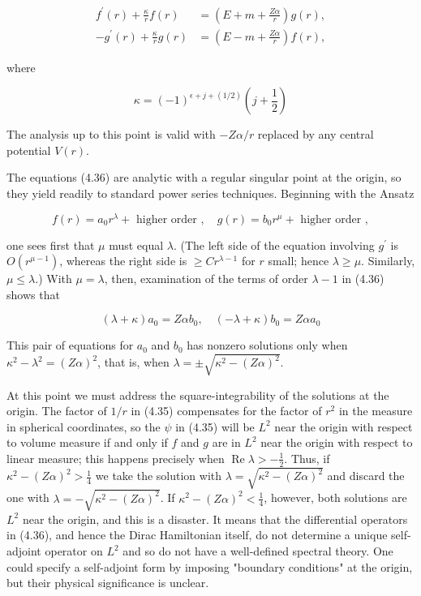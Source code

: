 \documentclass[10pt, letterpaper]{article}
\begin{document}
$$
\begin{aligned}
f^{\prime}(r)+\frac{\kappa}{r} f(r) & =\left(E+m+\frac{Z \alpha}{r}\right) g(r), \\
-g^{\prime}(r)+\frac{\kappa}{r} g(r) & =\left(E-m+\frac{Z \alpha}{r}\right) f(r),
\end{aligned}
$$

where

$$
\kappa=(-1)^{\epsilon+j+(1 / 2)}\left(j+\frac{1}{2}\right)
$$

The analysis up to this point is valid with $-Z \alpha / r$ replaced by any central potential $V(r)$.

The equations (4.36) are analytic with a regular singular point at the origin, so they yield readily to standard power series techniques. Beginning with the Ansatz

$$
f(r)=a_{0} r^{\lambda}+\text { higher order }, \quad g(r)=b_{0} r^{\mu}+\text { higher order },
$$

one sees first that $\mu$ must equal $\lambda$. (The left side of the equation involving $g^{\prime}$ is $O\left(r^{\mu-1}\right)$, whereas the right side is $\geq C r^{\lambda-1}$ for $r$ small; hence $\lambda \geq \mu$. Similarly, $\mu \leq \lambda$.) With $\mu=\lambda$, then, examination of the terms of order $\lambda-1$ in (4.36) shows that

$$
(\lambda+\kappa) a_{0}=Z \alpha b_{0}, \quad(-\lambda+\kappa) b_{0}=Z \alpha a_{0}
$$

This pair of equations for $a_{0}$ and $b_{0}$ has nonzero solutions only when $\kappa^{2}-\lambda^{2}= (Z \alpha)^{2}$, that is, when $\lambda= \pm \sqrt{\kappa^{2}-(Z \alpha)^{2}}$.

At this point we must address the square-integrability of the solutions at the origin. The factor of $1 / r$ in (4.35) compensates for the factor of $r^{2}$ in the measure in spherical coordinates, so the $\psi$ in (4.35) will be $L^{2}$ near the origin with respect to volume measure if and only if $f$ and $g$ are in $L^{2}$ near the origin with respect to linear measure; this happens precisely when $\operatorname{Re} \lambda>-\frac{1}{2}$. Thus, if $\kappa^{2}-(Z \alpha)^{2}>\frac{1}{4}$ we take the solution with $\lambda=\sqrt{\kappa^{2}-(Z \alpha)^{2}}$ and discard the one with $\lambda=-\sqrt{\kappa^{2}-(Z \alpha)^{2}}$. If $\kappa^{2}-(Z \alpha)^{2}<\frac{1}{4}$, however, both solutions are $L^{2}$ near the origin, and this is a disaster. It means that the differential operators in (4.36), and hence the Dirac Hamiltonian itself, do not determine a unique self-adjoint operator on $L^{2}$ and so do not have a well-defined spectral theory. One could specify a self-adjoint form by imposing "boundary conditions" at the origin, but their physical significance is unclear.
\end{document}
